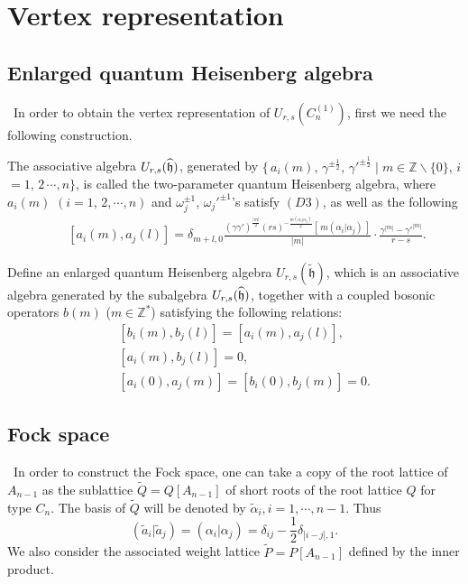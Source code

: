 \documentclass{amsproc}
\theoremstyle{remark}
\numberwithin{equation}{section}
\begin{document}
 \vskip 0.5cm

\section{Vertex representation }
\setcounter{equation}{0}

\subsection{Enlarged quantum Heisenberg algebra}\,  In order to obtain the vertex
representation of $U_{r,s}(C_n^{(1)})$, first we need the
following construction.

The associative algebra $U_{r,s}(\widehat{\frak{h}})$, generated by $\{\,a_i(m),\,
\gamma^{\pm\frac1{2}},\,\gamma'^{\pm\frac1{2}} \mid
m\in\mathbb{Z}\backslash \{0\},\,i$ $=1,\,2\,\cdots, n\}$, is called the two-parameter quantum Heisenberg algebra, where $a_i(m)$ $(i=1,\,2, \cdots, n)$ and $\omega_j^{\pm1}$, $\omega_j'^{\pm 1}$'s satisfy $(D3)$, as well as the following
\begin{eqnarray}
\qquad [a_i(m), a_j(l)]=\delta_{m+l, 0} \frac{
(\gamma\gamma')^{\frac{|m|}{2}}(rs)^{-\frac{m (\alpha_i|\alpha_j)}2}[\,m
(\alpha_i|\alpha_j)\,]}{|m|}\cdot\frac{\gamma^{|m|}-\gamma'^{|m|}}{r-s}.
\end{eqnarray}

Define an enlarged quantum Heisenberg algebra $U_{r,s}(\widetilde {\mathfrak h})$,
which is an associative algebra generated by the subalgebra $U_{r,s}(\widehat{\frak{h}})$, together with
a coupled bosonic operators $b(m)$ ($m\in\mathbb Z^*$) satisfying the following relations:
\begin{equation}
\begin{array}{rcl}
&& [b_i(m), b_j(l)]=[a_i(m), a_j(l)],\\
&&[a_i(m), b_j(l)]=0, \\
&& [a_i(0), a_j(m)]=[b_i(0), b_j(m)]=0.
\end{array}
\end{equation}

\subsection{Fock space}\,  In order to construct the Fock space, one can take a copy
of the root lattice of $A_{n-1}$ as the sublattice
$\tilde{Q}=Q[A_{n-1}]$ of short roots of the root lattice $Q$ for type $C_n$. The basis of
$\tilde{Q}$ will be denoted by $\tilde{\alpha}_i, i=1, \cdots, n-1$.
Thus
$$(\tilde{a}_i|\tilde{a}_j)=(\alpha_i|\alpha_j)=\delta_{ij}-\frac12\delta_{|i-j|, 1}.
$$
We also consider the associated weight lattice
$\tilde{P}=P[A_{n-1}]$ defined by the inner product.
\end{document}
